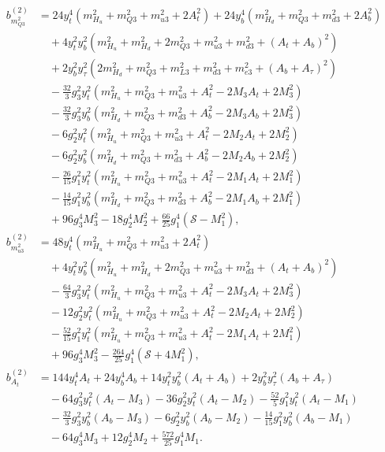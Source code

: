 \documentclass[preprint,amsmath,amssymb,aps,superscriptaddress,prd,showpacs,floatfix]{revtex4-1}
\begin{document}
\begin{subequations}\label{eq:MSSMsEffPotCoeffs}
\begin{align}
b_{m_{Q3}^2}^{(2)}&=24y_t^4\left ( m_{H_u}^2+m_{Q3}^2+m_{u3}^2+2A_t^2\right )+24y_b^4\left ( m_{H_d}^2+m_{Q3}^2+m_{d3}^2+2A_b^2\right )\nonumber\\
&\quad{}+4y_t^2y_b^2\left ( m_{H_u}^2+m_{H_d}^2+2m_{Q3}^2+m_{u3}^2+m_{d3}^2+(A_t+A_b)^2\right )\nonumber\\
&\quad{}+2y_b^2y_\tau^2\left ( 2m_{H_d}^2+m_{Q3}^2+m_{L3}^2+m_{d3}^2+m_{e3}^2+(A_b+A_\tau)^2\right )\nonumber\\
&\quad{}-\frac{32}{3}g_3^2y_t^2\left ( m_{H_u}^2+m_{Q3}^2+m_{u3}^2+A_t^2-2M_3A_t+2M_3^2\right )\nonumber\\
&\quad{}-\frac{32}{3}g_3^2y_b^2\left ( m_{H_d}^2+m_{Q3}^2+m_{d3}^2+A_b^2-2M_3A_b+2M_3^2\right )\nonumber\\
&\quad{}-6g_2^2y_t^2\left ( m_{H_u}^2+m_{Q3}^2+m_{u3}^2+A_t^2-2M_2A_t+2M_2^2\right )\nonumber\\
&\quad{}-6g_2^2y_b^2\left ( m_{H_d}^2+m_{Q3}^2+m_{d3}^2+A_b^2-2M_2A_b+2M_2^2\right )\nonumber\\
&\quad{}-\frac{26}{15}g_1^2y_t^2\left ( m_{H_u}^2+m_{Q3}^2+m_{u3}^2+A_t^2-2M_1A_t+2M_1^2\right )\nonumber\\
&\quad{}-\frac{14}{15}g_1^2y_b^2\left ( m_{H_d}^2+m_{Q3}^2+m_{d3}^2+A_b^2-2M_1A_b+2M_1^2\right )\nonumber\\
&\quad{}+96g_3^4M_3^2-18g_2^4M_2^2+\frac{66}{25}g_1^4(\mathcal{S}-M_1^2),\label{eq:MSSMmQ32b2}\\
b_{m_{u3}^2}^{(2)}&=48y_t^4\left ( m_{H_u}^2+m_{Q3}^2+m_{u3}^2+2A_t^2\right )\nonumber\\
&\quad{}+4y_t^2y_b^2\left ( m_{H_u}^2+m_{H_d}^2+2m_{Q3}^2+m_{u3}^2+m_{d3}^2+(A_t+A_b)^2\right )\nonumber\\
&\quad{}-\frac{64}{3}g_3^2y_t^2\left ( m_{H_u}^2+m_{Q3}^2+m_{u3}^2+A_t^2-2M_3A_t+2M_3^2\right )\nonumber\\
&\quad{}-12g_2^2y_t^2\left ( m_{H_u}^2+m_{Q3}^2+m_{u3}^2+A_t^2-2M_2A_t+2M_2^2\right )\nonumber\\
&\quad{}-\frac{52}{15}g_1^2y_t^2\left ( m_{H_u}^2+m_{Q3}^2+m_{u3}^2+A_t^2-2M_1A_t+2M_1^2\right )\nonumber\\
&\quad{}+96g_3^4M_3^2-\frac{264}{25}g_1^4\left ( \mathcal{S}+4M_1^2\right ),\label{eq:MSSMmu32b2}\\
b_{A_t}^{(2)}&=144y_t^4A_t+24y_b^4A_b+14y_t^2y_b^2(A_t+A_b)+2y_b^2y_\tau^2(A_b+A_\tau)\nonumber\\
&\quad{}-64g_3^2y_t^2(A_t-M_3)-36g_2^2y_t^2(A_t-M_2)-\frac{52}{5}g_1^2y_t^2(A_t-M_1)\nonumber\\
&\quad{}-\frac{32}{3}g_3^2y_b^2(A_b-M_3)-6g_2^2y_b^2(A_b-M_2)-\frac{14}{15}g_1^2y_b^2(A_b-M_1)\nonumber\\
&\quad{}-64g_3^4M_3+12g_2^4M_2+\frac{572}{25}g_1^4M_1.\label{eq:MSSMAtb2}
\end{align}
\end{subequations}
\end{document}
